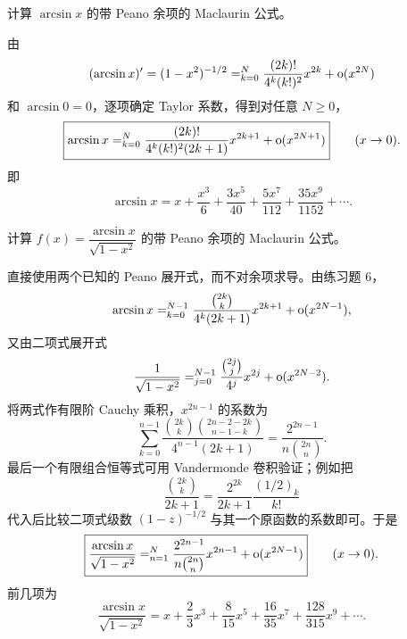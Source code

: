 \begin{xexercise}[6]
计算 $\arcsin x$ 的带 Peano 余项的 Maclaurin 公式。
\end{xexercise}
\begin{xsolution}
由
\[
  (\arcsin x)'=(1-x^2)^{-1/2}
  =\relax_{k=0}^N\frac{(2k)!}{4^k(k!)^2}x^{2k}
   +\mathrm{o}(x^{2N})
\]
和 $\arcsin0=0$，逐项确定 Taylor 系数，得到对任意 $N\geqslant0$，
\[
  \boxed{
  \arcsin x
  =\relax_{k=0}^N
    \frac{(2k)!}{4^k(k!)^2(2k+1)}x^{2k+1}
   +\mathrm{o}(x^{2N+1})
  }
  \qquad(x\to0).
\]
即
\[
  \arcsin x
  =x+\frac{x^3}{6}+\frac{3x^5}{40}
   +\frac{5x^7}{112}+\frac{35x^9}{1152}+\cdots.
\]
\end{xsolution}


\begin{xexercise}[7]
计算 $f(x)=\dfrac{\arcsin x}{\sqrt{1-x^2}}$ 的带 Peano 余项的 Maclaurin 公式。
\end{xexercise}
\begin{xsolution}
直接使用两个已知的 Peano 展开式，而不对余项求导。由练习题 6，
\[
  \arcsin x
  =\relax_{k=0}^{N-1}
    \frac{\binom{2k}{k}}{4^k(2k+1)}x^{2k+1}
   +\mathrm{o}(x^{2N-1}),
\]
又由二项式展开式
\[
  \frac1{\sqrt{1-x^2}}
  =\relax_{j=0}^{N-1}\frac{\binom{2j}{j}}{4^j}x^{2j}
   +\mathrm{o}(x^{2N-2}).
\]
将两式作有限阶 Cauchy 乘积，$x^{2n-1}$ 的系数为
\[
  \sum_{k=0}^{n-1}
  \frac{\binom{2k}{k}\binom{2n-2-2k}{n-1-k}}
       {4^{n-1}(2k+1)}
  =\frac{2^{2n-1}}{n\binom{2n}{n}}.
\]
最后一个有限组合恒等式可用 Vandermonde 卷积验证；例如把
\[
  \frac{\binom{2k}{k}}{2k+1}
  =\frac{2^{2k}}{2k+1}\frac{(1/2)_k}{k!}
\]
代入后比较二项式级数
$(1-z)^{-1/2}$ 与其一个原函数的系数即可。于是
\[
  \boxed{
  \frac{\arcsin x}{\sqrt{1-x^2}}
  =\relax_{n=1}^N
    \frac{2^{2n-1}}{n\binom{2n}{n}}x^{2n-1}
  +\mathrm{o}(x^{2N-1})
  }
  \qquad(x\to0).
\]
前几项为
\[
  \frac{\arcsin x}{\sqrt{1-x^2}}
  =x+\frac23x^3+\frac{8}{15}x^5
   +\frac{16}{35}x^7+\frac{128}{315}x^9+\cdots.
\]
\end{xsolution}


